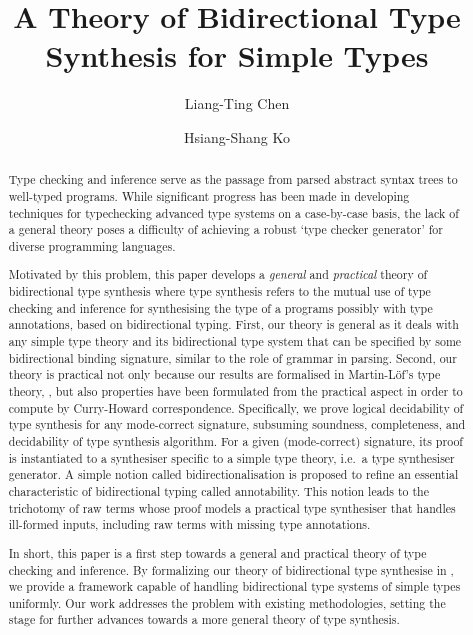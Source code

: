 \documentclass[acmsmall,screen]{acmart}
\theoremstyle{acmdefinition}
\begin{document}
\author{Liang-Ting Chen}
\author{Hsiang-Shang Ko}


\title{A Theory of Bidirectional Type Synthesis for Simple Types}

\begin{abstract}
  Type checking and inference serve as the passage from parsed abstract syntax trees to well-typed programs.
  While significant progress has been made in developing techniques for typechecking advanced type systems on a case-by-case basis, the lack of a general theory poses a difficulty of achieving a robust `type checker generator' for diverse programming languages.

  Motivated by this problem, this paper develops a \emph{general} and \emph{practical} theory of bidirectional type synthesis where type synthesis refers to the mutual use of type checking and inference for synthesising the type of a programs possibly with type annotations, based on bidirectional typing.
  First, our theory is general as it deals with any simple type theory and its bidirectional type system that can be specified by some bidirectional binding signature, similar to the role of grammar in parsing.
  Second, our theory is practical not only because our results are formalised in Martin-L\"{o}f's type theory, \Agda, but also properties have been formulated from the practical aspect in order to compute by Curry-Howard correspondence.
  Specifically, we prove logical decidability of type synthesis for any mode-correct signature, subsuming soundness, completeness, and decidability of type synthesis algorithm.
  For a given (mode-correct) signature, its proof is instantiated to a synthesiser specific to a simple type theory, i.e.\ a type synthesiser generator.
  A simple notion called bidirectionalisation is proposed to refine an essential characteristic of bidirectional typing called annotability.
  This notion leads to the trichotomy of raw terms whose proof models a practical type synthesiser that handles ill-formed inputs, including raw terms with missing type annotations.

  In short, this paper is a first step towards a general and practical theory of type checking and inference.
  By formalizing our theory of bidirectional type synthesise in \Agda, we provide a framework capable of handling bidirectional type systems of simple types uniformly.
  Our work addresses the problem with existing methodologies, setting the stage for further advances towards a more general theory of type synthesis.
\end{abstract}
\end{document}
